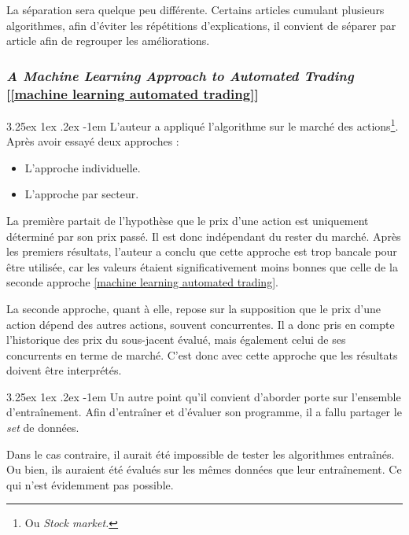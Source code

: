 \documentclass[a4paper, 11pt]{article}
\makeatletter
\newcounter{subsubsubsection}[subsubsection]
\renewcommand\paragraph{\@startsection{paragraph}{5}{\z@}%
  {3.25ex \@plus1ex \@minus.2ex}%
  {-1em}%
  {\normalfont\normalsize\bfseries}}
\makeatother
\begin{document}
La séparation sera quelque peu différente. Certains articles cumulant plusieurs algorithmes, afin d'éviter les répétitions d'explications, il convient de séparer par article afin de regrouper les améliorations.

\subsubsection{\textit{A Machine Learning Approach to Automated Trading} [\ref{machine learning automated trading}]}

\paragraph{}
L'auteur a appliqué l'algorithme sur le marché des actions\footnote{Ou \textit{Stock market.}}. Après avoir essayé deux approches :
\begin{itemize}
\item L'approche individuelle.
\item L'approche par secteur.
\end{itemize}

La première partait de l'hypothèse que le prix d'une action est uniquement déterminé par son prix passé. Il est donc indépendant du rester du marché. Après les premiers résultats, l'auteur a conclu que cette approche est trop bancale pour être utilisée, car les valeurs étaient significativement moins bonnes que celle de la seconde approche \ref{machine learning automated trading}.

La seconde approche, quant à elle, repose sur la supposition que le prix d'une action dépend des autres actions, souvent concurrentes. Il a donc pris en compte l'historique des prix du sous-jacent évalué, mais également celui de ses concurrents en terme de marché.
C'est donc avec cette approche que les résultats doivent être interprétés.

\paragraph{}
Un autre point qu'il convient d'aborder porte sur l'ensemble d'entraînement. Afin d'entraîner et d'évaluer son programme, il a fallu partager le \textit{set} de données.

Dans le cas contraire, il aurait été impossible de tester les algorithmes entraînés. Ou bien, ils auraient été évalués sur les mêmes données que leur entraînement. Ce qui n'est évidemment pas possible.
\end{document}
